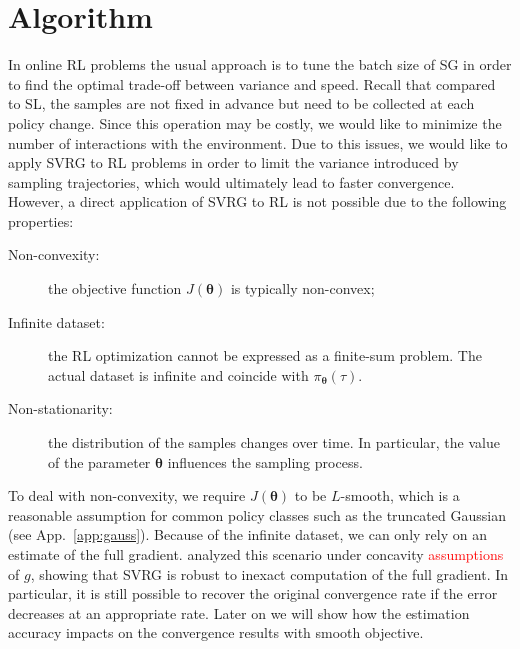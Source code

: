 \documentclass{article}
\theoremstyle{remark}
\theoremstyle{definition}
\newcommand{\todopir}[1]{\todo[color=blued, inline]{\small #1}}
\newcommand{\vtheta}{\boldsymbol{\theta}}
\begin{document}
\section{Algorithm}\label{sec:alg}
In online RL problems the usual approach is to tune the batch size of SG in order to find the optimal trade-off between variance and speed.
Recall that compared to SL, the samples are not fixed in advance but need to be collected at each policy change.
Since this operation may be costly, we would like to minimize the number of interactions with the environment.
Due to this issues, we would like to apply SVRG to RL problems in order to limit the variance introduced by sampling trajectories, which would ultimately lead to faster convergence.
However, a direct application of SVRG to RL is not possible due to the following properties:
\begin{description}
        \item[Non-convexity:] the objective function $J(\vtheta)$ is typically non-convex;
        \item[Infinite dataset:] the RL optimization cannot be expressed as a finite-sum problem. The actual dataset is infinite and coincide with $\pi_{\vtheta}(\tau)$.
        \item[Non-stationarity:] the distribution of the samples changes over time. In particular, the value of the parameter $\vtheta$ influences the sampling process.
\end{description}
To deal with non-convexity, we require $J(\vtheta)$ to be $L$-smooth, which is a reasonable assumption for common policy classes such as the truncated Gaussian (see App.~\ref{app:gauss}).
Because of the infinite dataset, we can only rely on an estimate of the full gradient. \citet{harikandeh2015stopwasting} analyzed this scenario under concavity \textcolor{red}{assumptions} of $g$, showing that SVRG is robust to inexact computation of the full gradient. In particular, it is still possible to recover the original convergence rate if the error decreases at an appropriate rate. {\color{red}Later on we will show how the estimation accuracy impacts on the convergence results with smooth objective.} 
\end{document}
